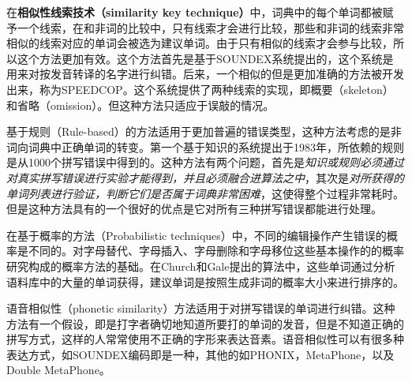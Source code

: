\documentclass[UTF8,a4paper]{ctexart}
\begin{document}
在\textbf{相似性线索技术（similarity key technique）}中，词典中的每个单词都被赋予一个线索，在和非词的比较中，只有线索才会进行比较，那些和非词的线索非常相似的线索对应的单词会被选为建议单词。由于只有相似的线索才会参与比较，所以这个方法更加有效。这个方法首先是基于SOUNDEX系统\cite{odell1918soundex}提出的，这个系统是用来对按发音转译的名字进行纠错。后来，一个相似的但是更加准确的方法被开发出来，称为SPEEDCOP\cite{pollock1984system}。这个系统提供了两种线索的实现，即概要（skeleton）和省略（omission）。但这种方法只适应于误敲的情况。

基于规则（Rule-based）的方法适用于更加普遍的错误类型，这种方法考虑的是非词向词典中正确单词的转变。第一个基于知识的系统提出于1983年\cite{yannakoudakis1983intelligent,yannakoudakis1983rules}，所依赖的规则是从1000个拼写错误中得到的。这种方法有两个问题，首先是\textit{知识或规则必须通过对真实拼写错误进行实验才能得到，并且必须融合进算法之中}，其次是\textit{对所获得的单词列表进行验证，判断它们是否属于词典非常困难}，这使得整个过程非常耗时。但是这种方法具有的一个很好的优点是它对所有三种拼写错误都能进行处理。

在基于概率的方法（Probabilistic techniques）中，不同的编辑操作产生错误的概率是不同的。对字母替代、字母插入、字母删除和字母移位这些基本操作的的概率研究构成的概率方法的基础。在Church和Gale提出的算法\cite{church1991probability}中，这些单词通过分析语料库中的大量的单词获得，建议单词是按照生成非词的概率大小来进行排序的。

语音相似性（phonetic similarity）方法适用于对拼写错误的单词进行纠错。这种方法有一个假设，即是打字者确切地知道所要打的单词的发音，但是不知道正确的拼写方式，这样的人常常使用不正确的字形来表达音素。语音相似性可以有很多种表达方式，如SOUNDEX编码\cite{odell1918soundex}即是一种，其他的如PHONIX\cite{gadd1990phonix}，MetaPhone\cite{philips1990hanging}，以及Double MetaPhone\cite{philips2000double}。


\clearpage


\end{document}

